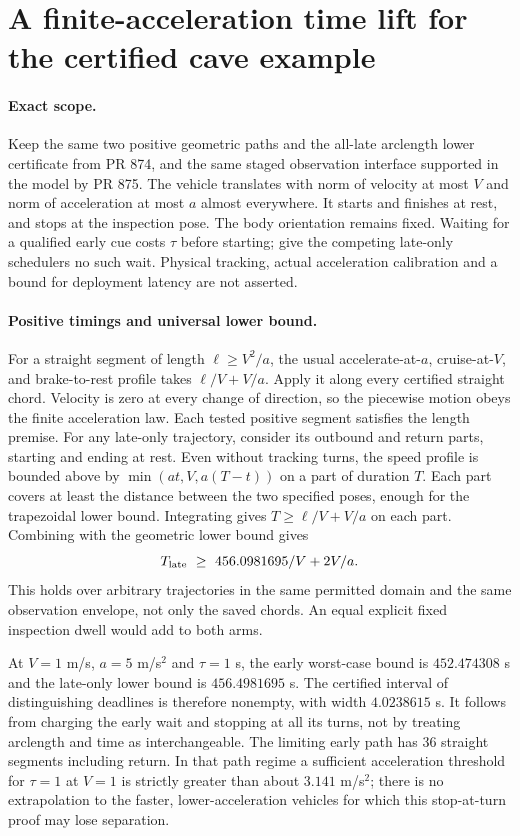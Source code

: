 \documentclass{article}
\begin{document}
\section*{A finite-acceleration time lift for the certified cave example}
\paragraph{Exact scope.}
Keep the same two positive geometric paths and the all-late
arclength lower certificate from PR 874, and the same staged
observation interface supported in the model by PR 875.
The vehicle translates with norm of velocity at most $V$ and
norm of acceleration at most $a$ almost everywhere. It starts
and finishes at rest, and stops at the inspection pose. The
body orientation remains fixed. Waiting for a qualified early
cue costs $\tau$ before starting; give the competing late-only
schedulers no such wait. Physical tracking, actual acceleration
calibration and a bound for deployment latency are not asserted.

\paragraph{Positive timings and universal lower bound.}
For a straight segment of length $\ell\ge V^2/a$, the usual
accelerate-at-$a$, cruise-at-$V$, and brake-to-rest profile takes
$\ell/V+V/a$. Apply it along every certified straight chord.
Velocity is zero at every change of direction, so the
piecewise motion obeys the finite acceleration law. Each
tested positive segment satisfies the length premise.
For any late-only trajectory, consider its outbound and return
parts, starting and ending at rest. Even without tracking
turns, the speed profile is bounded above by
$\min(at,V,a(T-t))$ on a part of duration $T$. Each part covers
at least the distance between the two specified poses, enough
for the trapezoidal lower bound. Integrating gives
$T\ge\ell/V+V/a$ on each part. Combining with the geometric
lower bound gives
\[
 T_{\rm late}\ \ge\ 456.0981695/V+2V/a .
\]
This holds over arbitrary trajectories in the same permitted
domain and the same observation envelope, not only the saved
chords. An equal explicit fixed inspection dwell would add to
both arms.

At $V=1$ m/s, $a=5$ m/s$^2$ and $\tau=1$ s, the early
worst-case bound is $452.474308$ s and the late-only lower bound
is $456.4981695$ s. The certified interval of distinguishing
deadlines is therefore nonempty, with width $4.0238615$ s.
It follows from charging the early wait and stopping at all its
turns, not by treating arclength and time as interchangeable.
The limiting early path has 36 straight segments including
return. In that path regime a sufficient acceleration threshold
for $\tau=1$ at $V=1$ is strictly greater than about $3.141$ m/s$^2$;
there is no extrapolation to the faster, lower-acceleration
vehicles for which this stop-at-turn proof may lose separation.
\end{document}
